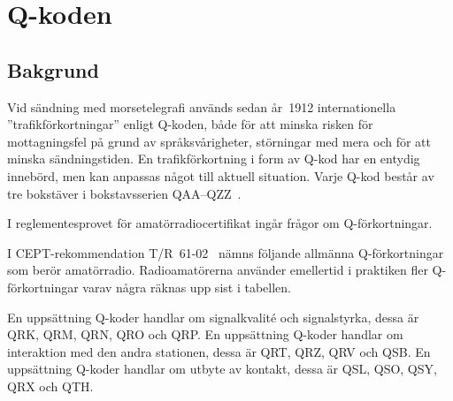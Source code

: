 \newpage
\section{Q-koden}
\label{q-koden}

\subsection{Bakgrund}

Vid sändning med morsetelegrafi används sedan år~1912 internationella
''trafikförkortningar'' enligt Q-koden, både för att minska risken för
mottagningsfel på grund av språksvårigheter, störningar med mera och för
att minska sändningstiden.
En trafikförkortning i form av Q-kod har en entydig innebörd, men kan anpassas
något till aktuell situation.
Varje Q-kod består av tre bokstäver i bokstavsserien
QAA--QZZ~\cite[M.1172]{ITU-RR}.

I reglementesprovet för amatörradiocertifikat ingår frågor om Q-förkortningar.

I CEPT-rekommendation T/R~61-02~\cite[Annex 6]{TR6102} nämns följande allmänna
Q-förkortningar som berör amatörradio.
Radioamatörerna använder emellertid i praktiken fler Q-förkortningar varav
några räknas upp sist i tabellen.

En uppsättning Q-koder handlar om signalkvalité och signalstyrka, dessa är
QRK, QRM, QRN, QRO och QRP.
En uppsättning Q-koder handlar om interaktion med den andra stationen,
dessa är QRT, QRZ, QRV och QSB.
En uppsättning Q-koder handlar om utbyte av kontakt, dessa är QSL, QSO,
QSY, QRX och QTH.

